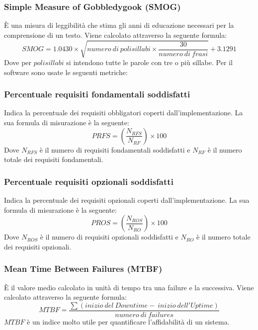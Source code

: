 		\subsubsection{Simple Measure of Gobbledygook (SMOG)}\label{C.2.4} È una misura di leggibilità che stima gli anni di educazione necessari per la comprensione di un testo. Viene calcolato attraverso la seguente formula: \newline
		\[
		SMOG=1.0430\times\sqrt{numero ~di ~polisillabi\times\frac{30}{numero ~di ~frasi}}+3.1291
		\]\newline
		Dove per $polisillabi$ si intendono tutte le parole con tre o più sillabe.
		\newline \newline \newline
		Per il software sono usate le seguenti metriche:\newline
		\subsubsection{Percentuale requisiti fondamentali soddisfatti} Indica la percentuale dei requisiti obbligatori coperti dall’implementazione. La sua
		formula di misurazione è la seguente:\newline
		\[
		PRFS=(\frac{N_{RFS}}{N_{RF}}) \times 100
		\]	
		Dove $N_{RFS}$ è il numero di requisiti fondamentali soddisfatti e $N_{RF}$ è il numero totale
		dei requisiti fondamentali.\clearpage
		\subsubsection{Percentuale requisiti opzionali soddisfatti} Indica la percentuale dei requisiti opzionali coperti dall’implementazione. La sua formula di misurazione è la seguente:\newline
		\[
		PROS=(\frac{N_{ROS}}{N_{RO}}) \times 100
		\]	
		Dove $N_{ROS}$ è il numero di requisiti opzionali soddisfatti e $N_{RO}$ è il numero totale
		dei requisiti opzionali.
		\subsubsection{Mean Time Between Failures (MTBF)} È il valore medio calcolato in unità di tempo tra una failure e la successiva. Viene calcolato attraverso la seguente formula:\newline
		\[
		MTBF=\frac{\sum(inizio ~del ~Downtime - ~inizio ~dell'Uptime)}{numero ~di ~failures}
		\]\newline
		$MTBF$ è un indice molto utile per quantificare l'affidabilità di un sistema.

